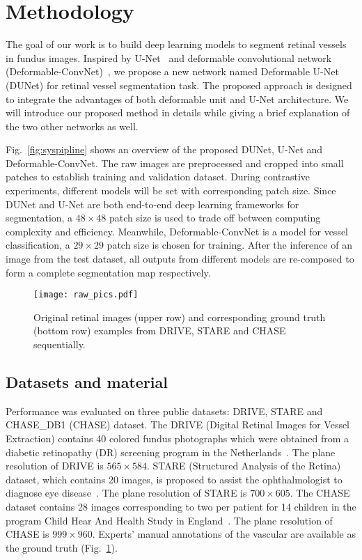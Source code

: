 \documentclass[journal]{IEEEtran}
\begin{document}
\section{Methodology}
\label{sec:method}
The goal of our work is to build deep learning models to segment retinal vessels in fundus images. Inspired by U-Net~\cite{ronneberger_u-net:_2015} and deformable convolutional network (Deformable-ConvNet)~\cite{dai_deformable_2017}, we propose a new network named Deformable U-Net (DUNet) for retinal vessel segmentation task. The proposed approach is designed to integrate the advantages of both deformable unit and U-Net architecture. We will introduce our proposed method in details while giving a brief explanation of the two other networks as well.


Fig.~\ref{fig:syspipline} shows an overview of the proposed DUNet, U-Net and Deformable-ConvNet. The raw images are preprocessed and cropped into small patches to establish training and validation dataset. During contrastive experiments, different models will be set with corresponding patch size. Since DUNet and U-Net are both end-to-end deep learning frameworks for segmentation, a $48 \times 48$ patch size is used to trade off between computing complexity and efficiency. Meanwhile, Deformable-ConvNet is a model for vessel classification, a $29 \times 29$ patch size is chosen for training. After the inference of an image from the test dataset, all outputs from different models are re-composed to form a complete segmentation map respectively.

\begin{figure}
\centering
\texttt{[image: raw\_pics.pdf]}
\caption{Original retinal images (upper row) and corresponding ground truth (bottom row) examples from DRIVE, STARE and CHASE sequentially.}
\label{fig:raw_pics}
\end{figure}

\subsection{Datasets and material}
Performance was evaluated on three public datasets: DRIVE, STARE and CHASE\_DB1 (CHASE) dataset. The DRIVE (Digital Retinal Images for Vessel Extraction) contains 40 colored fundus photographs which were obtained from a diabetic retinopathy (DR) screening program in the Netherlands~\cite{Staal2004Ridge}. The plane resolution of DRIVE is $565 \times 584$. STARE (Structured Analysis of the Retina) dataset, which contains 20 images, is proposed to assist the ophthalmologist to diagnose eye disease~\cite{hoover_locating_1998}. The plane resolution of STARE is $700 \times 605$. The CHASE dataset contains 28 images corresponding to two per patient for 14 children in the program Child Hear And Health Study in England~\cite{Owen2009Measuring}. The plane resolution of CHASE is $999 \times 960$. Experts' manual annotations of the vascular are available as the ground truth (Fig.~\ref{fig:raw_pics}).
\end{document}

